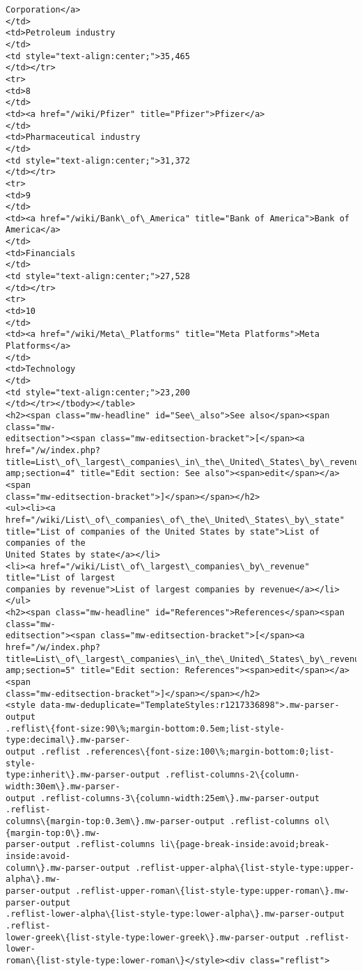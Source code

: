 \documentclass[11pt]{article}
\begin{document}
\begin{Verbatim}[commandchars=\\\{\}]
Corporation</a>
</td>
<td>Petroleum industry
</td>
<td style="text-align:center;">35,465
</td></tr>
<tr>
<td>8
</td>
<td><a href="/wiki/Pfizer" title="Pfizer">Pfizer</a>
</td>
<td>Pharmaceutical industry
</td>
<td style="text-align:center;">31,372
</td></tr>
<tr>
<td>9
</td>
<td><a href="/wiki/Bank\_of\_America" title="Bank of America">Bank of America</a>
</td>
<td>Financials
</td>
<td style="text-align:center;">27,528
</td></tr>
<tr>
<td>10
</td>
<td><a href="/wiki/Meta\_Platforms" title="Meta Platforms">Meta Platforms</a>
</td>
<td>Technology
</td>
<td style="text-align:center;">23,200
</td></tr></tbody></table>
<h2><span class="mw-headline" id="See\_also">See also</span><span class="mw-
editsection"><span class="mw-editsection-bracket">[</span><a href="/w/index.php?
title=List\_of\_largest\_companies\_in\_the\_United\_States\_by\_revenue\&amp;action=edit\&
amp;section=4" title="Edit section: See also"><span>edit</span></a><span
class="mw-editsection-bracket">]</span></span></h2>
<ul><li><a href="/wiki/List\_of\_companies\_of\_the\_United\_States\_by\_state"
title="List of companies of the United States by state">List of companies of the
United States by state</a></li>
<li><a href="/wiki/List\_of\_largest\_companies\_by\_revenue" title="List of largest
companies by revenue">List of largest companies by revenue</a></li></ul>
<h2><span class="mw-headline" id="References">References</span><span class="mw-
editsection"><span class="mw-editsection-bracket">[</span><a href="/w/index.php?
title=List\_of\_largest\_companies\_in\_the\_United\_States\_by\_revenue\&amp;action=edit\&
amp;section=5" title="Edit section: References"><span>edit</span></a><span
class="mw-editsection-bracket">]</span></span></h2>
<style data-mw-deduplicate="TemplateStyles:r1217336898">.mw-parser-output
.reflist\{font-size:90\%;margin-bottom:0.5em;list-style-type:decimal\}.mw-parser-
output .reflist .references\{font-size:100\%;margin-bottom:0;list-style-
type:inherit\}.mw-parser-output .reflist-columns-2\{column-width:30em\}.mw-parser-
output .reflist-columns-3\{column-width:25em\}.mw-parser-output .reflist-
columns\{margin-top:0.3em\}.mw-parser-output .reflist-columns ol\{margin-top:0\}.mw-
parser-output .reflist-columns li\{page-break-inside:avoid;break-inside:avoid-
column\}.mw-parser-output .reflist-upper-alpha\{list-style-type:upper-alpha\}.mw-
parser-output .reflist-upper-roman\{list-style-type:upper-roman\}.mw-parser-output
.reflist-lower-alpha\{list-style-type:lower-alpha\}.mw-parser-output .reflist-
lower-greek\{list-style-type:lower-greek\}.mw-parser-output .reflist-lower-
roman\{list-style-type:lower-roman\}</style><div class="reflist">

\end{Verbatim}
\end{document}

